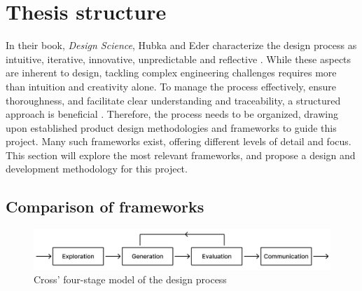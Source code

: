 \section{Thesis structure}

In their book, \textit{Design Science}, Hubka and Eder characterize the design process as intuitive, iterative, innovative, unpredictable and reflective \cite{hubka_eder}. While these aspects are inherent to design, tackling complex engineering challenges requires more than intuition and creativity alone. To manage the process effectively, ensure thoroughness, and facilitate clear understanding and traceability, a structured approach is beneficial \cite{eder}. Therefore, the process needs to be organized, drawing upon established product design methodologies and frameworks to guide this project. Many such frameworks exist, offering different levels of detail and focus. This section will explore the most relevant frameworks, and propose a design and development methodology for this project.

\subsection{Comparison of frameworks}
\vspace{2em}
\begin{figure}[htb!]
  \centering
  \includegraphics[width=\textwidth]{Pictures/Figures/cross.png}
  \caption{Cross' four-stage model of the design process}
  \label{fig:cross}
\end{figure}

